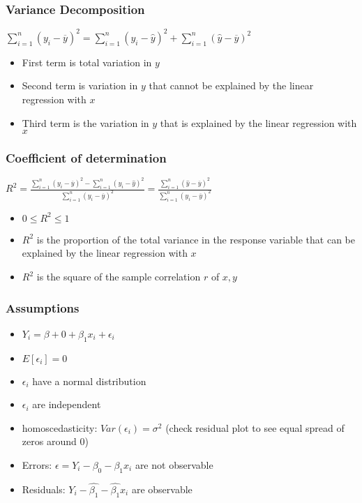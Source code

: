 \documentclass{article}
\begin{document}
\subsubsection{Variance Decomposition}
$\sum_{i=1}^n(y_i-\overline{y})^2=\sum_{i=1}^n(y_i-\hat{y})^2+\sum_{i=1}^n(\hat{y}-\overline{y})^2$\\
\begin{itemize}
    \item First term is total variation in $y$
    \item Second term is variation in $y$ that cannot be explained by the linear regression with $x$
    \item Third term is the variation in $y$ that is explained by the linear regression with $x$
\end{itemize}
\subsubsection{Coefficient of determination}
$R^2=\frac{\sum_{i=1}^n(y_i-\overline{y})^2-\sum_{i=1}^n(y_i-\hat{y})^2}{\sum_{i=1}^n(y_i-\overline{y})^2}=\frac{\sum_{i=1}^n(\hat{y}-\overline{y})^2}{\sum_{i=1}^n(y_i-\overline{y})^2}$
\begin{itemize}
    \item $0\leq R^2\leq 1$
    \item $R^2$ is the proportion of the total variance in the response variable that can be explained by the linear regression with $x$
    \item $R^2$ is the square of the sample correlation $r$ of $x,y$
\end{itemize}
\subsubsection{Assumptions}
\begin{itemize}
    \item $Y_i=\beta+0+\beta_1x_i+\epsilon_i$
    \item $E[\epsilon_i]=0$
    \item $\epsilon_i$ have a normal distribution
    \item $\epsilon_i$ are independent
    \item homoscedasticity: $Var(\epsilon_i)=\sigma^2$ (check residual plot to see equal spread of zeros around 0)
    \item Errors: $\epsilon = Y_i-\beta_0-\beta_1x_i$ are not observable
    \item Residuals: $Y_i-\hat{\beta_1}-\hat{\beta_1}x_i$ are observable
\end{itemize}
\end{document}
